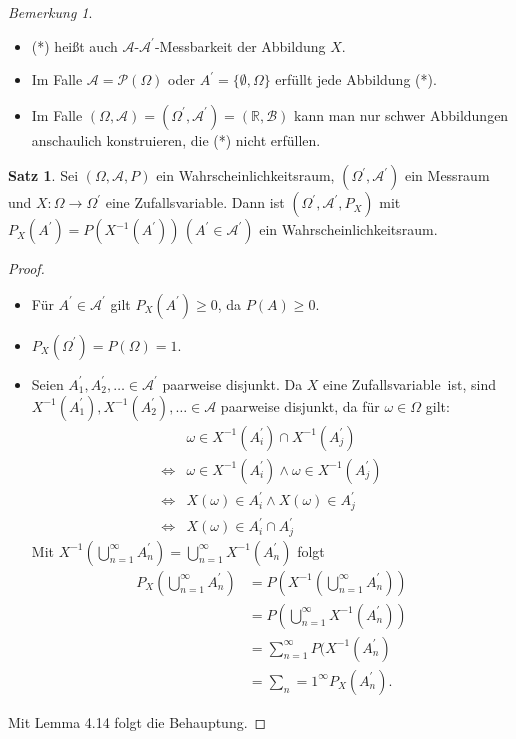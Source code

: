 \documentclass[a4paper,12pt,fleqn]{scrartcl}
\newcommand{\R}{\mathbb{R}}
\newcommand{\m}[1]{\mathcal{ #1 }}
\newcommand{\WR}{Wahrscheinlichkeitsraum}
\newcommand{\ZV}{Zufallsvariable}
\theoremstyle{definition}
\newtheorem{satz}[definition]{Satz}
\theoremstyle{plain}
\theoremstyle{remark}
\newtheorem*{bemerkung}{Bemerkung}
\begin{document}
\begin{bemerkung}
\begin{itemize}
\item (*) heißt auch $\m{A}$-$\m{A}^\prime$-Messbarkeit der Abbildung $X$.
\item Im Falle $\m{A} = \m{P}( \Omega )$ oder $A^\prime = \{ \emptyset , \Omega \}$ erfüllt jede Abbildung (*).
\item Im Falle $( \Omega , \m{A}) = ( \Omega^\prime , \m{A}^\prime) = ( \R , \m{B} ) $ kann man nur schwer Abbildungen \glqq anschaulich konstruieren\grqq, die (*) nicht erfüllen.
\end{itemize}
\end{bemerkung}
\begin{satz}
Sei $( \Omega , \m{A} , P)$ ein \WR , $(\Omega^\prime, \m{A}^\prime)$ ein Messraum und $X : \Omega \rightarrow \Omega^\prime$ eine \ZV. Dann ist $( \Omega^\prime , \m{A}^\prime , P_X) $ mit $ P_X(A^\prime) = P(X^{-1}(A^\prime)) \, ( A^\prime \in \m{A}^\prime ) $ ein \WR.
\end{satz}
\begin{proof}
\begin{itemize}
\item Für $ A^\prime \in \m{A}^\prime$ gilt $P_X(A^\prime) \geq 0 $, da $P(A) \geq 0$.
\item $P_X(\Omega^\prime ) = P(\Omega) = 1$.
\item Seien $A_1^\prime, A_2^\prime, \ldots \in \m{A}^\prime $ paarweise disjunkt. Da $X$ eine \ZV \, ist, sind $X^{-1}(A_1^\prime), X^{-1}(A_2^\prime), \ldots \in \m{A}$ paarweise disjunkt, da für $ \omega \in \Omega $ gilt: 
\begin{align*}
&\omega \in X^{-1}(A_i^\prime) \cap X^{-1}(A_j^\prime) \\
\Leftrightarrow &\omega \in X^{-1}(A_i^\prime) \land \omega \in X^{-1}(A_j^\prime) \\
\Leftrightarrow &X(\omega) \in A_i^\prime \land X(\omega) \in A_j^\prime \\
\Leftrightarrow &X(\omega) \in A_i^\prime \cap A_j^\prime
\end{align*} 
Mit $X^{-1}( \bigcup_{n=1}^{ \infty }{A_n^\prime} ) = \bigcup_{n=1}^{ \infty }{X^{-1}(A_n^\prime)}$ folgt
\begin{align*}
P_X(\bigcup_{n=1}^{ \infty }{A_n^\prime}) &= P(X^{-1} ( \bigcup_{n=1}^{ \infty }{A_n^\prime} )) \\
&= P(\bigcup_{n=1}^{ \infty }{X^{-1}(A_n^\prime)}) \\
&= \sum_{n=1}^{\infty}{P(X^{-1}(A_n^\prime)} \\
&= \sum_n=1^\infty {P_X(A_n^\prime)}.
\end{align*}
\end{itemize}
Mit Lemma 4.14 folgt die Behauptung.
\end{proof}
\end{document}
